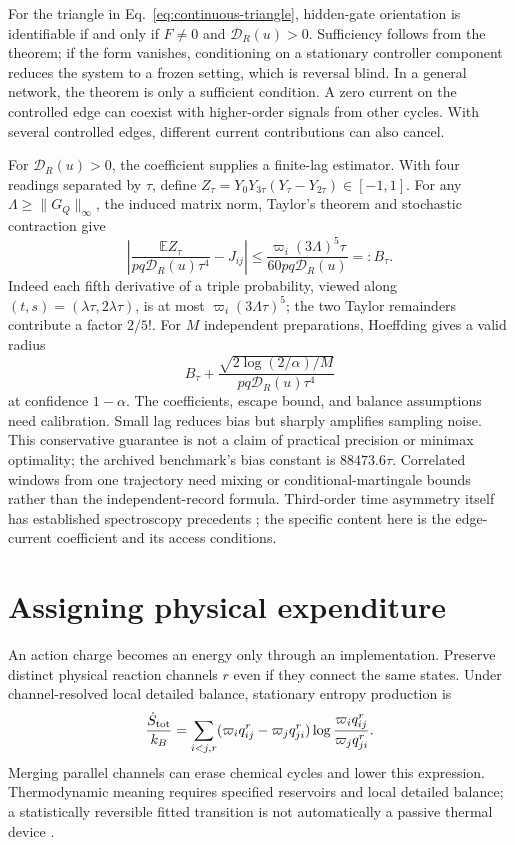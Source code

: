 For the triangle in Eq.~\eqref{eq:continuous-triangle}, hidden-gate
orientation is identifiable if and only if $F\ne0$ and
$\mathcal D_R(u)>0$. Sufficiency follows from the theorem; if the form
vanishes, conditioning on a stationary controller component reduces the
system to a frozen setting, which is reversal blind. In a general network,
the theorem is only a sufficient condition. A zero current on the controlled
edge can coexist with higher-order signals from other cycles. With several
controlled edges, different current contributions can also cancel.

For $\mathcal D_R(u)>0$, the coefficient supplies a finite-lag estimator.
With four readings separated
by $\tau$, define $Z_\tau=Y_0Y_{3\tau}(Y_\tau-Y_{2\tau})\in[-1,1]$.
For any $\Lambda\geq\|G_Q\|_\infty$, the induced matrix norm, Taylor's theorem
and stochastic contraction give
\begin{equation}
 \left|\frac{\mathbb E Z_\tau}{pq\mathcal D_R(u)\tau^4}-J_{ij}\right|
 \leq\frac{\varpi_i(3\Lambda)^5\tau}{60pq\mathcal D_R(u)}=:B_\tau.
 \label{eq:continuous-gate-bias}
\end{equation}
Indeed each fifth derivative of a triple probability, viewed along
$(t,s)=(\lambda\tau,2\lambda\tau)$, is at most
$\varpi_i(3\Lambda\tau)^5$; the two Taylor remainders contribute a factor
$2/5!$. For $M$ independent preparations, Hoeffding gives a valid radius
\begin{equation}
 B_\tau+\frac{\sqrt{2\log(2/\alpha)/M}}
                   {pq\mathcal D_R(u)\tau^4}
 \label{eq:continuous-gate-ci}
\end{equation}
at confidence $1-\alpha$. The coefficients, escape bound, and balance
assumptions need calibration. Small lag reduces bias but sharply amplifies
sampling noise. This conservative guarantee is not a claim of practical
precision or minimax optimality; the archived benchmark's bias constant is
$88473.6\tau$. Correlated windows from one trajectory need mixing or
conditional-martingale bounds rather than the independent-record formula.
Third-order time asymmetry itself has established spectroscopy precedents
\cite{physics-qian}; the specific content here is the edge-current coefficient
and its access conditions.

\section{Assigning physical expenditure}

An action charge becomes an energy only through an implementation. Preserve
distinct physical reaction channels $r$ even if they connect the same states.
Under channel-resolved local detailed balance, stationary entropy production
is
\begin{equation}
 \frac{\dot S_{\rm tot}}{k_B}
  =\sum_{i<j,r}(\varpi_iq^r_{ij}-\varpi_jq^r_{ji})
       \log\frac{\varpi_iq^r_{ij}}{\varpi_jq^r_{ji}}.
 \label{eq:continuous-entropy}
\end{equation}
Merging parallel channels can erase chemical cycles and lower this expression.
Thermodynamic meaning requires specified reservoirs and local detailed
balance; a statistically reversible fitted transition is not automatically a
passive thermal device \cite{physics-rao}.

